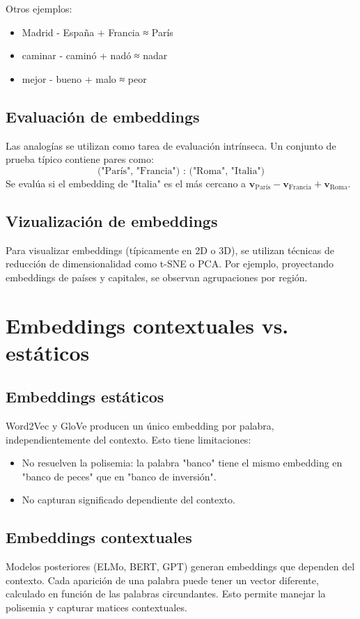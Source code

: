\documentclass[12pt,a4paper,openany,oneside]{book}
\begin{document}
Otros ejemplos:
\begin{itemize}
    \item Madrid - España + Francia ≈ París
    \item caminar - caminó + nadó ≈ nadar
    \item mejor - bueno + malo ≈ peor
\end{itemize}

\subsection{Evaluación de embeddings}
Las analogías se utilizan como tarea de evaluación intrínseca. Un conjunto de prueba típico contiene pares como:
\[
\text{("París", "Francia") : ("Roma", "Italia")}
\]
Se evalúa si el embedding de "Italia" es el más cercano a \(\mathbf{v}_{\text{París}} - \mathbf{v}_{\text{Francia}} + \mathbf{v}_{\text{Roma}}\).

\subsection{Vizualización de embeddings}
Para visualizar embeddings (típicamente en 2D o 3D), se utilizan técnicas de reducción de dimensionalidad como t-SNE o PCA. Por ejemplo, proyectando embeddings de países y capitales, se observan agrupaciones por región.

\section{Embeddings contextuales vs. estáticos}

\subsection{Embeddings estáticos}
Word2Vec y GloVe producen un único embedding por palabra, independientemente del contexto. Esto tiene limitaciones:
\begin{itemize}
    \item No resuelven la polisemia: la palabra "banco" tiene el mismo embedding en "banco de peces" que en "banco de inversión".
    \item No capturan significado dependiente del contexto.
\end{itemize}

\subsection{Embeddings contextuales}
Modelos posteriores (ELMo, BERT, GPT) generan embeddings que dependen del contexto. Cada aparición de una palabra puede tener un vector diferente, calculado en función de las palabras circundantes. Esto permite manejar la polisemia y capturar matices contextuales.
\end{document}
